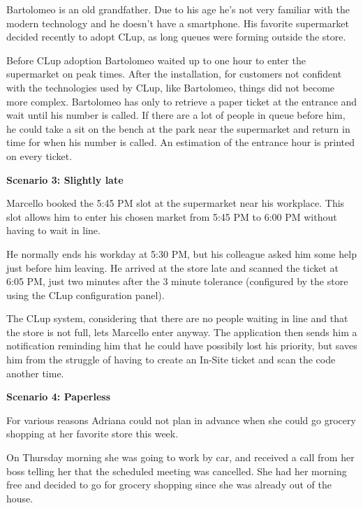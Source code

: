 Bartolomeo is an old grandfather. Due to his age he's not very familiar with the modern technology and he doesn't have a smartphone. His favorite supermarket decided recently to adopt CLup, as long queues were forming outside the store.

\smallskip

Before CLup adoption Bartolomeo waited up to one hour to enter the supermarket on peak times. After the installation, for customers not confident with the technologies used by CLup, like Bartolomeo, things did not become more complex. Bartolomeo has only to retrieve a paper ticket at the entrance and wait until his number is called. If there are a lot of people in queue before him, he could take a sit on the bench at the park near the supermarket and return in time for when his number is called. An estimation of the entrance hour is printed on every ticket.

\vfill


\textbf{Scenario 3: Slightly late}

Marcello booked the 5:45 PM slot at the supermarket near his workplace. This slot allows him to enter his chosen market from 5:45 PM to 6:00 PM without having to wait in line.

\smallskip

He normally ends his workday at 5:30 PM, but his colleague asked him some help just before him leaving. He arrived at the store late and scanned the ticket at 6:05 PM, just two minutes after the 3 minute tolerance (configured by the store using the CLup configuration panel).

\smallskip

The CLup system, considering that there are no people waiting in line and that the store is not full, lets Marcello enter anyway.
The application then sends him a notification reminding him that he could have possibily lost his priority, but saves him from the struggle of having to create an In-Site ticket and scan the code another time.

\medskip

\textbf{Scenario 4: Paperless}

For various reasons Adriana could not plan in advance when she could go grocery shopping at her favorite store this week.

\smallskip
On Thursday morning she was going to work by car, and received a call from her boss telling her that the scheduled meeting was cancelled. She had her morning free and decided to go for grocery shopping since she was already out of the house.

